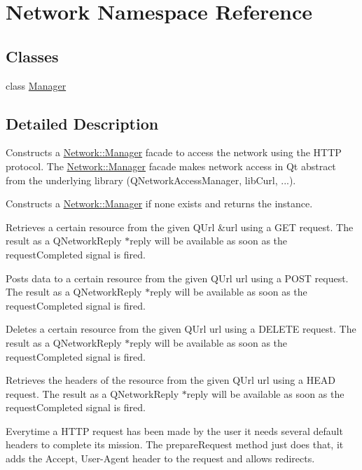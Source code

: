 \hypertarget{namespaceNetwork}{}\section{Network Namespace Reference}
\label{namespaceNetwork}
\subsection*{Classes}
\begin{DoxyCompactItemize}
\item 
class \mbox{\hyperlink{classNetwork_1_1Manager}{Manager}}
\end{DoxyCompactItemize}


\subsection{Detailed Description}
Constructs a \mbox{\hyperlink{classNetwork_1_1Manager}{Network\+::\+Manager}} facade to access the network using the H\+T\+TP protocol. The \mbox{\hyperlink{classNetwork_1_1Manager}{Network\+::\+Manager}} facade makes network access in Qt abstract from the underlying library (Q\+Network\+Access\+Manager, lib\+Curl, ...).

Constructs a \mbox{\hyperlink{classNetwork_1_1Manager}{Network\+::\+Manager}} if none exists and returns the instance.

Retrieves a certain resource from the given Q\+Url \&url using a G\+ET request. The result as a Q\+Network\+Reply $\ast$reply will be available as soon as the request\+Completed signal is fired.

Posts data to a certain resource from the given Q\+Url url using a P\+O\+ST request. The result as a Q\+Network\+Reply $\ast$reply will be available as soon as the request\+Completed signal is fired.

Deletes a certain resource from the given Q\+Url url using a D\+E\+L\+E\+TE request. The result as a Q\+Network\+Reply $\ast$reply will be available as soon as the request\+Completed signal is fired.

Retrieves the headers of the resource from the given Q\+Url url using a H\+E\+AD request. The result as a Q\+Network\+Reply $\ast$reply will be available as soon as the request\+Completed signal is fired.

Everytime a H\+T\+TP request has been made by the user it needs several default headers to complete it\textquotesingle{}s mission. The prepare\+Request method just does that, it adds the Accept, User-\/\+Agent header to the request and allows redirects.

